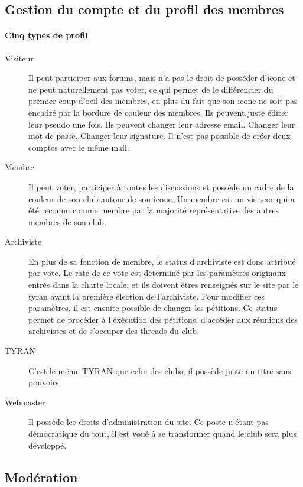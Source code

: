 \documentclass[a4paper,12pt]{article}
\begin{document}
\subsection{Gestion du compte et du profil des membres}
\paragraph{Cinq types de profil}
\begin{description}
 \item [Visiteur] Il peut participer aux forums, mais n'a pas le droit de posséder d'icone et ne peut naturellement pas voter, ce qui permet de le différencier du premier coup d'oeil des membres, en plus du fait que son icone ne soit pas encadré par la bordure de couleur des membres. Ils peuvent juste éditer leur pseudo une fois. Ils peuvent changer leur adresse email. Changer leur mot de passe. Changer leur signature. Il n'est pas possible de créer deux comptes avec le même mail.
 \item [Membre] Il peut voter, participer à toutes les discussions et possède un cadre de la couleur de son club autour de son icone. Un membre est un visiteur qui a été reconnu comme membre par la majorité représentative des autres membres de son club.
 \item [Archiviste] En plus de sa fonction de membre, le status d'archiviste est donc attribué par vote. Le rate de ce vote est déterminé par les paramètres originaux entrés dans la charte locale, et ils doivent êtres renseignés sur le site par le tyran avant la première élection de l'archiviste. Pour modifier ces paramètres, il est ensuite possible de changer les pétitions. Ce status permet de procéder à l'éxécution des pétitions, d'accéder aux réunions des archivistes et de s'occuper des threads du club. 
 \item [TYRAN] C'est le même TYRAN que celui des clubs, il possède juste un titre sans pouvoirs.
 \item [Webmaster] Il possède les droits d'administration du site. Ce poste n'étant pas démocratique du tout, il est voué à se transformer quand le club sera plus développé.
\end{description}

\subsection{Modération}
\end{document}
